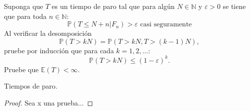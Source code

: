 \begin{problema}
		Suponga que \(T\) es un tiempo de paro tal que para algún 
		\(N\in\mathbb{N}\) y \(\varepsilon>0\) se tiene que para toda \(n\in\mathbb{N}\):
		$$ \mathbb{P} (T \leq N + n | F_n) > \varepsilon \text{ casi seguramente} $$
		Al verificar la desomposici\'on
		$$ \mathbb{P} (T>kN)= \mathbb{P} (T>kN,T>(k-1)N), $$
		pruebe por inducci\'on que para cada \(k=1,2,\ldots\):
		$$ \mathbb{P} (T>kN)\leq (1-\varepsilon)^k.  $$
		Pruebe que \( \mathbb{E}(T)<\infty \). 
	\begin{categoria} Tiempos de paro.\end{categoria}
\end{problema}

\begin{proof}
	Sea x una prueba...
\end{proof}	